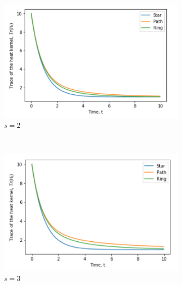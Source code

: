 \documentclass[10pt,a4paper]{article}
\theoremstyle{plain}
\theoremstyle{definition}
\begin{document}
\begin{figure}[H]
\begin{subfigure}[b]{0.45\textwidth}
        	\end{subfigure}\\
        	\begin{subfigure}[b]{0.45\textwidth}
        		\includegraphics[width= \textwidth]{images/graphskernelmellin2.png}
        		\caption{$s=2$}
        		\label{threegraphMellin2}
        	\end{subfigure}~
        	\begin{subfigure}[b]{0.45\textwidth}
        		\includegraphics[width= \textwidth]{images/graphskernelmellin3.png}
        		\caption{$s=3$}
        		\label{threegraphMellin3}
        	\end{subfigure} \\
        	\begin{subfigure}[b]{0.45\textwidth}

\end{subfigure}
\end{figure}
\end{document}
